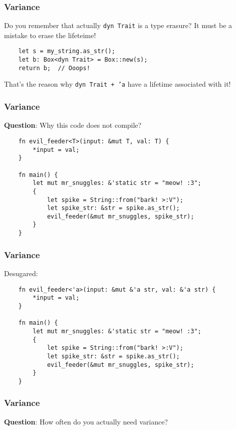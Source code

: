 \documentclass[aspectratio=1610,t]{beamer}
\begin{document}

\begin{frame}[fragile]
\frametitle{Variance}
Do you remember that actually \texttt{dyn Trait} is a type erasure? It must be a mistake to erase the lifeteime!

\begin{verbatim}
    let s = my_string.as_str();
    let b: Box<dyn Trait> = Box::new(s);
    return b;  // Ooops!
\end{verbatim}

That's the reason why \texttt{dyn Trait + 'a} have a lifetime associated with it!
\end{frame}


\begin{frame}[fragile]
\frametitle{Variance}
\textbf{Question}: Why this code does not compile?

\begin{verbatim}
    fn evil_feeder<T>(input: &mut T, val: T) {
        *input = val;
    }

    fn main() {
        let mut mr_snuggles: &'static str = "meow! :3";
        {
            let spike = String::from("bark! >:V");
            let spike_str: &str = spike.as_str();
            evil_feeder(&mut mr_snuggles, spike_str);
        }
    }
\end{verbatim}
\end{frame}


\begin{frame}[fragile]
\frametitle{Variance}
Desugared:

\begin{verbatim}
    fn evil_feeder<'a>(input: &mut &'a str, val: &'a str) {
        *input = val;
    }

    fn main() {
        let mut mr_snuggles: &'static str = "meow! :3";
        {
            let spike = String::from("bark! >:V");
            let spike_str: &str = spike.as_str();
            evil_feeder(&mut mr_snuggles, spike_str);
        }
    }
\end{verbatim}
\end{frame}


\begin{frame}[fragile]
\frametitle{Variance}
\textbf{Question}: How often do you actually need variance?

\end{frame}
\end{document}
